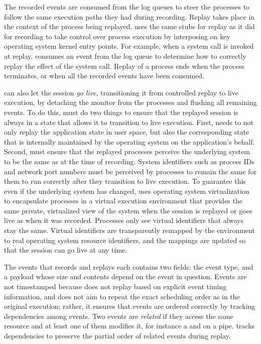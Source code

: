 The recorded events are consumed from the log queues to steer the
processes to follow the same execution paths they had
during recording.  Replay takes place in the context of the
process being replayed.  \scribe{} uses the same stubs for replay as
it did for recording to take control over process execution by
interposing on key operating system kernel entry points.  For example,
when a system call is invoked at replay, \scribe{} consumes an event
from the log queue to determine how to correctly replay the effect of
the system call.  Replay of a process ends when the process
terminates, or when all the recorded events have been consumed.

\scribe{} can also let the session {\em go live}, transitioning it
from controlled replay to live execution, by detaching the monitor
from the processes and flushing all remaining events.  To do this,
\scribe{} must do two things to ensure that the replayed session
is always in a state that allows it to transition to live execution.
First, \scribe{} needs to not only replay the application state in
user space, but also the corresponding state that is internally
maintained by the operating system on the application's behalf.
Second, \scribe{} must ensure that the replayed processes perceive the
underlying system to be the same as at the time of recording.  
System identifiers such as process IDs and network port numbers must
be perceived by processes to remain the same for them to run correctly
after they transition to live execution.  To guarantee this
even if the underlying system has changed, \scribe{} uses operating
system virtualization~\cite{zap02} to encapsulate processes in a
virtual execution environment that provides the same private,
virtualized view of the system when the session is replayed or goes
live as when it was recorded.  Processes only see virtual identifiers
that always stay the same.  Virtual identifiers are transparently
remapped by the environment to real operating system resource
identifiers, and the mappings are updated so that the session can go
live at any time.

The events that \scribe{} records and replays each contains two fields:
the event type, and a payload whose size and contents depend
on the event in question.  Events are not timestamped
because \scribe{} does not replay based on explicit event timing
information, and does not aim to repeat the exact scheduling
order as in the original execution; rather, it ensures that events are
ordered correctly by tracking dependencies among events.  Two events
are {\em related} if they access the same resource and at least one of
them modifies it, for instance a  and  on a
pipe.  \scribe{} tracks dependencies to preserve the partial order of
related events during replay.  

